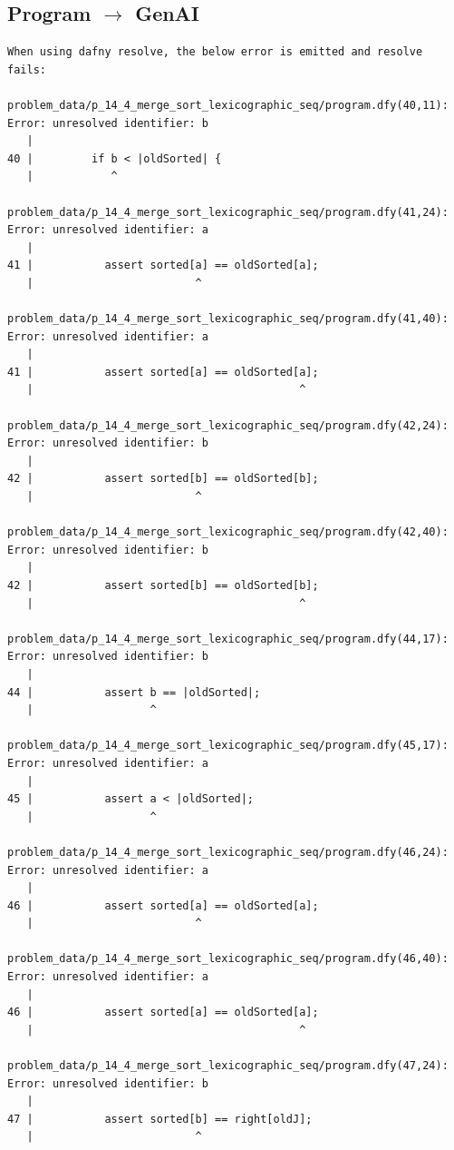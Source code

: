 \documentclass{article}
\begin{document}
\subsection*{Program $\rightarrow$ GenAI}
\begin{lstlisting}
When using dafny resolve, the below error is emitted and resolve fails:

problem_data/p_14_4_merge_sort_lexicographic_seq/program.dfy(40,11): Error: unresolved identifier: b
   |
40 |         if b < |oldSorted| {
   |            ^

problem_data/p_14_4_merge_sort_lexicographic_seq/program.dfy(41,24): Error: unresolved identifier: a
   |
41 |           assert sorted[a] == oldSorted[a];
   |                         ^

problem_data/p_14_4_merge_sort_lexicographic_seq/program.dfy(41,40): Error: unresolved identifier: a
   |
41 |           assert sorted[a] == oldSorted[a];
   |                                         ^

problem_data/p_14_4_merge_sort_lexicographic_seq/program.dfy(42,24): Error: unresolved identifier: b
   |
42 |           assert sorted[b] == oldSorted[b];
   |                         ^

problem_data/p_14_4_merge_sort_lexicographic_seq/program.dfy(42,40): Error: unresolved identifier: b
   |
42 |           assert sorted[b] == oldSorted[b];
   |                                         ^

problem_data/p_14_4_merge_sort_lexicographic_seq/program.dfy(44,17): Error: unresolved identifier: b
   |
44 |           assert b == |oldSorted|;
   |                  ^

problem_data/p_14_4_merge_sort_lexicographic_seq/program.dfy(45,17): Error: unresolved identifier: a
   |
45 |           assert a < |oldSorted|;
   |                  ^

problem_data/p_14_4_merge_sort_lexicographic_seq/program.dfy(46,24): Error: unresolved identifier: a
   |
46 |           assert sorted[a] == oldSorted[a];
   |                         ^

problem_data/p_14_4_merge_sort_lexicographic_seq/program.dfy(46,40): Error: unresolved identifier: a
   |
46 |           assert sorted[a] == oldSorted[a];
   |                                         ^

problem_data/p_14_4_merge_sort_lexicographic_seq/program.dfy(47,24): Error: unresolved identifier: b
   |
47 |           assert sorted[b] == right[oldJ];
   |                         ^


\end{lstlisting}
\end{document}
